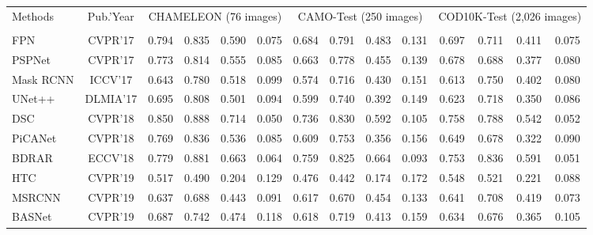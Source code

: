 \documentclass[final]{cvpr}
\begin{document}
\begin{table*}[t]
	\centering
\footnotesize
	\renewcommand\arraystretch{1.0}
	\setlength{\tabcolsep}{6.0pt}
	\begin{tabular}{l|c|cccc|cccc|cccc}
		\hline
		\multirow{2}{*}{Methods} & \multirow{2}{*}{Pub.'Year} &  \multicolumn{4}{c|}{CHAMELEON (76 images)} & \multicolumn{4}{c|}{CAMO-Test (250 images)} & \multicolumn{4}{c}{COD10K-Test (2,026 images)} \\
\cline{3-14}
		& &  &  &  &  &  &  &  &  &  &  &  &   \\
		
		\hline
		
		FPN \cite{lin2017feature_fpn}             & CVPR'17 & 0.794 & 0.835 & 0.590 & 0.075 & 0.684 & 0.791 & 0.483 & 0.131 & 0.697 & 0.711 & 0.411 & 0.075     \\
		PSPNet \cite{zhao2017pyramid_pspnet}           & CVPR'17 & 0.773 & 0.814 & 0.555 & 0.085 & 0.663 & 0.778 & 0.455 & 0.139 & 0.678 & 0.688 & 0.377 & 0.080     \\
		Mask RCNN \cite{he2017mask_maskrcnn}        & ICCV'17 & 0.643 & 0.780 & 0.518 & 0.099 & 0.574 & 0.716 & 0.430 & 0.151 & 0.613 & 0.750 & 0.402 & 0.080     \\
		UNet++ \cite{zhou2018unet++}          & DLMIA'17 & 0.695 & 0.808 & 0.501 & 0.094 & 0.599 & 0.740 & 0.392 & 0.149 & 0.623 & 0.718 & 0.350 & 0.086     \\
		DSC \cite{Hu_2018_CVPR_dsc}       & CVPR'18 & 0.850 & 0.888 & 0.714 & 0.050 & 0.736 & 0.830 & 0.592 & 0.105 & 0.758 & 0.788 & 0.542  & 0.052 \\
		PiCANet \cite{liu2018picanet}          & CVPR'18 & 0.769 & 0.836 & 0.536 & 0.085 & 0.609 & 0.753 & 0.356 & 0.156 & 0.649 & 0.678 & 0.322 & 0.090     \\
		BDRAR \cite{Zhu_2018_ECCV_bdrar}    & ECCV'18 & 0.779 & 0.881 & 0.663 & 0.064 & 0.759 & 0.825 & 0.664 & 0.093 & 0.753 & 0.836 & 0.591 & 0.051 \\
		HTC \cite{chen2019hybrid_htc}             & CVPR'19 & 0.517 & 0.490 & 0.204 & 0.129 & 0.476 & 0.442 & 0.174 & 0.172 & 0.548 & 0.521 & 0.221 & 0.088     \\
		MSRCNN \cite{huang2019mask_msrcnn}           & CVPR'19 & 0.637 & 0.688 & 0.443 & 0.091 & 0.617 & 0.670 & 0.454 & 0.133 & 0.641 & 0.708 & 0.419 & 0.073     \\
		BASNet \cite{qin2019basnet}           & CVPR'19 & 0.687 & 0.742 & 0.474 & 0.118 & 0.618 & 0.719 & 0.413 & 0.159 & 0.634 & 0.676 & 0.365 & 0.105     \\

\end{tabular}
\end{table*}
\end{document}
